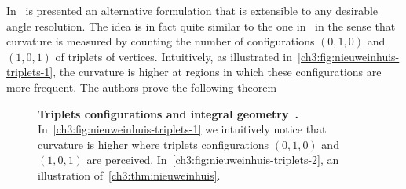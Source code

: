 In~\cite{nieuwenhuis14efficient} is presented an alternative formulation that is extensible to any desirable angle resolution. The idea is in fact quite similar to the one in~\cite{zehiry10fast} in the sense that curvature is measured by counting the number of configurations $(0,1,0)$ and $(1,0,1)$ of triplets of vertices. Intuitively, as illustrated in~\cref{ch3:fig:nieuweinhuis-triplets-1}, the curvature is higher at regions in which these configurations are more frequent. The authors prove the following theorem

\begin{figure}
\center
{}
\caption{\textbf{Triplets configurations and integral geometry~\cite{nieuwenhuis14efficient}.} In~\cref{ch3:fig:nieuweinhuis-triplets-1} we intuitively notice that curvature is higher where triplets configurations $(0,1,0)$ and $(1,0,1)$ are perceived. In~\cref{ch3:fig:nieuweinhuis-triplets-2}, an illustration of~\cref{ch3:thm:nieuweinhuis}. }
\label{ch3:fig:nieuweinhuis-triplets}
\end{figure}

